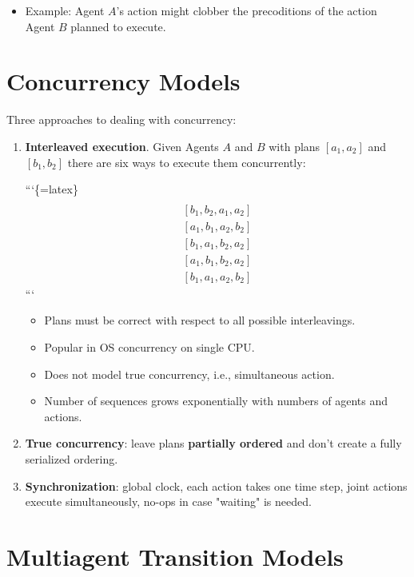 \documentclass[11pt]{article}
\begin{document}
\begin{itemize}
\item Example: Agent \(A\)'s action might clobber the precoditions of the action Agent \(B\) planned to execute.
\end{itemize}
\section{Concurrency Models}
\label{sec:org59c5d5e}

Three approaches to dealing with concurrency:

\begin{enumerate}
\item \textbf{Interleaved execution}.  Given Agents \(A\) and \(B\) with plans \([a_1, a_2]\) and \([b_1, b_2]\) there are six ways to execute them concurrently:

```\{=latex\}
\begin{align*}
[a_1,a_2,b_1,b_2]\\
[b_1,b_2,a_1,a_2]\\
[a_1,b_1,a_2,b_2]\\
[b_1,a_1,b_2,a_2]\\
[a_1,b_1,b_2,a_2]\\
[b_1,a_1,a_2,b_2]
\end{align*}
```

\begin{itemize}
\item Plans must be correct with respect to all possible interleavings.
\item Popular in OS concurrency on single CPU.
\item Does not model true concurrency, i.e., simultaneous action.
\item Number of sequences grows exponentially with numbers of agents and actions.
\end{itemize}

\item \textbf{True concurrency}: leave plans \textbf{partially ordered} and don't create a fully serialized ordering.

\item \textbf{Synchronization}: global clock, each action takes one time step, joint actions execute simultaneously, no-ops in case "waiting" is needed.
\end{enumerate}
\section{Multiagent Transition Models}
\label{sec:org3201feb}
\end{document}
